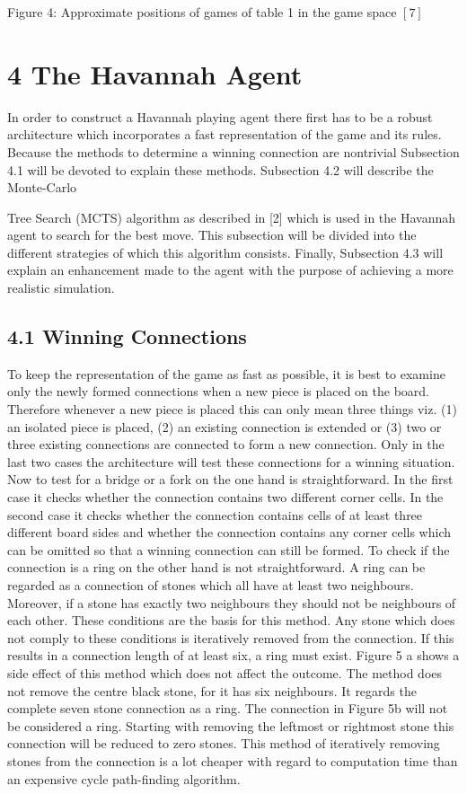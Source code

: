\documentclass[10pt]{article}
\begin{document}
Figure 4: Approximate positions of games of table 1 in the game space $[7]$

\section*{4 The Havannah Agent}
In order to construct a Havannah playing agent there first has to be a robust architecture which incorporates a fast representation of the game and its rules. Because the methods to determine a winning connection are nontrivial Subsection 4.1 will be devoted to explain these methods. Subsection 4.2 will describe the Monte-Carlo

Tree Search (MCTS) algorithm as described in [2] which is used in the Havannah agent to search for the best move. This subsection will be divided into the different strategies of which this algorithm consists. Finally, Subsection 4.3 will explain an enhancement made to the agent with the purpose of achieving a more realistic simulation.

\subsection*{4.1 Winning Connections}
To keep the representation of the game as fast as possible, it is best to examine only the newly formed connections when a new piece is placed on the board. Therefore whenever a new piece is placed this can only mean three things viz. (1) an isolated piece is placed, (2) an existing connection is extended or (3) two or three existing connections are connected to form a new connection. Only in the last two cases the architecture will test these connections for a winning situation. Now to test for a bridge or a fork on the one hand is straightforward. In the first case it checks whether the connection contains two different corner cells. In the second case it checks whether the connection contains cells of at least three different board sides and whether the connection contains any corner cells which can be omitted so that a winning connection can still be formed. To check if the connection is a ring on the other hand is not straightforward. A ring can be regarded as a connection of stones which all have at least two neighbours. Moreover, if a stone has exactly two neighbours they should not be neighbours of each other. These conditions are the basis for this method. Any stone which does not comply to these conditions is iteratively removed from the connection. If this results in a connection length of at least six, a ring must exist. Figure 5 a shows a side effect of this method which does not affect the outcome. The method does not remove the centre black stone, for it has six neighbours. It regards the complete seven stone connection as a ring. The connection in Figure 5b will not be considered a ring. Starting with removing the leftmost or rightmost stone this connection will be reduced to zero stones. This method of iteratively removing stones from the connection is a lot cheaper with regard to computation time than an expensive cycle path-finding algorithm.
\end{document}
